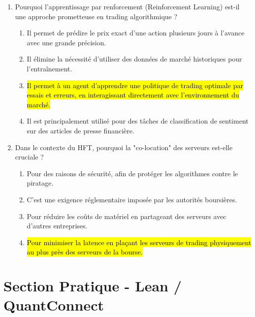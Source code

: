 \documentclass[a4paper,12pt]{article}
\begin{document}
\begin{enumerate}
    \item Pourquoi l'apprentissage par renforcement (Reinforcement Learning) est-il une approche prometteuse en trading algorithmique ?
    \begin{enumerate}[label=(\Alph*)]
        \item Il permet de prédire le prix exact d'une action plusieurs jours à l'avance avec une grande précision.
        \item Il élimine la nécessité d'utiliser des données de marché historiques pour l'entraînement.
        \item \hl{Il permet à un agent d'apprendre une politique de trading optimale par essais et erreurs, en interagissant directement avec l'environnement du marché.}
        \item Il est principalement utilisé pour des tâches de classification de sentiment sur des articles de presse financière.
    \end{enumerate}
    
    \item Dans le contexte du HFT, pourquoi la "co-location" des serveurs est-elle cruciale ?
    \begin{enumerate}[label=(\Alph*)]
        \item Pour des raisons de sécurité, afin de protéger les algorithmes contre le piratage.
        \item C'est une exigence réglementaire imposée par les autorités boursières.
        \item Pour réduire les coûts de matériel en partageant des serveurs avec d'autres entreprises.
        \item \hl{Pour minimiser la latence en plaçant les serveurs de trading physiquement au plus près des serveurs de la bourse.}
    \end{enumerate}

\end{enumerate}

\newpage

\section*{Section Pratique - Lean / QuantConnect}
\end{document}
